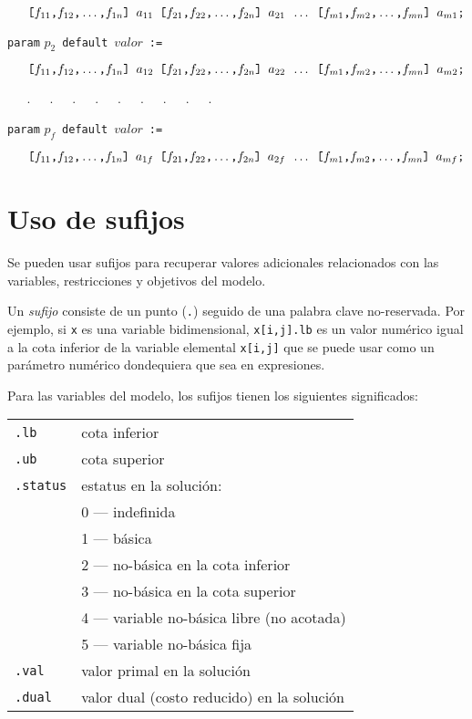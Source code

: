 \documentclass[11pt,spanish]{report}
\begin{document}
$\verb|   |
\verb|[|f_{11}\verb|,|f_{12}\verb|,|\dots\verb|,|f_{1n}\verb|] |a_{11}
\verb| [|f_{21}\verb|,|f_{22}\verb|,|\dots\verb|,|f_{2n}\verb|] |a_{21}
\verb| |\dots
\verb| [|f_{m1}\verb|,|f_{m2}\verb|,|\dots\verb|,|f_{mn}\verb|] |a_{m1}
\verb|;|
$

\verb|param| $p_2$\ \verb|default|\ $valor$\ \verb|:=|

$\verb|   |
\verb|[|f_{11}\verb|,|f_{12}\verb|,|\dots\verb|,|f_{1n}\verb|] |a_{12}
\verb| [|f_{21}\verb|,|f_{22}\verb|,|\dots\verb|,|f_{2n}\verb|] |a_{22}
\verb| |\dots
\verb| [|f_{m1}\verb|,|f_{m2}\verb|,|\dots\verb|,|f_{mn}\verb|] |a_{m2}
\verb|;|
$

\verb|   |.\ \ \ .\ \ \ .\ \ \ .\ \ \ .\ \ \ .\ \ \ .\ \ \ .\ \ \ .

\verb|param| $p_f$\ \verb|default|\ $valor$\ \verb|:=|

$\verb|   |
\verb|[|f_{11}\verb|,|f_{12}\verb|,|\dots\verb|,|f_{1n}\verb|] |a_{1f}
\verb| [|f_{21}\verb|,|f_{22}\verb|,|\dots\verb|,|f_{2n}\verb|] |a_{2f}
\verb| |\dots
\verb| [|f_{m1}\verb|,|f_{m2}\verb|,|\dots\verb|,|f_{mn}\verb|] |a_{mf}
\verb|;|
$


\appendix

\chapter{Uso de sufijos}

\vspace*{-12pt}

Se pueden usar sufijos para recuperar valores adicionales relacionados con las variables, restricciones y objetivos del modelo.

Un {\it sufijo} consiste de un punto ({\tt.}) seguido de una palabra clave no-reservada. Por ejemplo, si {\tt x} es una variable bidimensional, {\tt x[i,j].lb} es un valor numérico igual a la cota inferior de la variable elemental {\tt x[i,j]} que se puede usar como un parámetro numérico dondequiera que sea en expresiones.

Para las variables del modelo, los sufijos tienen los siguientes significados:

\begin{tabular}{@{}ll@{}}
{\tt.lb}&cota inferior\\
{\tt.ub}&cota superior\\
{\tt.status}&estatus en la solución:\\
&0 --- indefinida\\
&1 --- básica\\
&2 --- no-básica en la cota inferior\\
&3 --- no-básica en la cota superior\\
&4 --- variable no-básica libre (no acotada)\\
&5 --- variable no-básica fija\\
{\tt.val}&valor primal en la solución\\
{\tt.dual}&valor dual (costo reducido) en la solución\\
\end{tabular}
\end{document}
